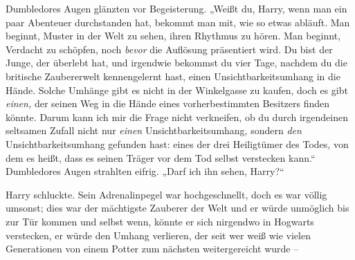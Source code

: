 Dumbledores Augen glänzten vor Begeisterung. „Weißt du, Harry, wenn man ein paar Abenteuer durchstanden hat, bekommt man mit, wie so etwas abläuft. Man beginnt, Muster in der Welt zu sehen, ihren Rhythmus zu hören. Man beginnt, Verdacht zu schöpfen, noch \emph{bevor} die Auflösung präsentiert wird. Du bist der Junge, der überlebt hat, und irgendwie bekommst du vier Tage, nachdem du die britische Zaubererwelt kennengelernt hast, einen Unsichtbarkeitsumhang in die Hände. Solche Umhänge gibt es nicht in der Winkelgasse zu kaufen, doch es gibt \emph{einen,} der seinen Weg in die Hände eines vorherbestimmten Besitzers finden könnte. Darum kann ich mir die Frage nicht verkneifen, ob du durch irgendeinen seltsamen Zufall nicht nur \emph{einen} Unsichtbarkeitsumhang, sondern \emph{den} Unsichtbarkeitsumhang gefunden hast: eines der drei Heiligtümer des Todes, von dem es heißt, dass es seinen Träger vor dem Tod selbst verstecken kann.“ Dumbledores Augen strahlten eifrig. „Darf ich ihn sehen, Harry?“

Harry schluckte. Sein Adrenalinpegel war hochgeschnellt, doch es war völlig umsonst; dies war der mächtigste Zauberer der Welt und er würde unmöglich bis zur Tür kommen und selbst wenn, könnte er sich nirgendwo in Hogwarts verstecken, er würde den Umhang verlieren, der seit wer weiß wie vielen Generationen von einem Potter zum nächsten weitergereicht wurde –

